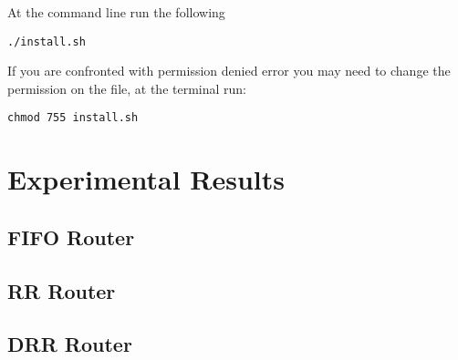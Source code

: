 \documentclass[11pt]{article}
\begin{document}
At the command line run the following

\begin{lstlisting}
./install.sh
\end{lstlisting}

If you are confronted with permission denied error you may need to change the permission on the file, at the terminal run:

\begin{lstlisting}
chmod 755 install.sh
\end{lstlisting}


\section{Experimental Results}

\subsection{FIFO Router}

\subsection{RR Router}

\subsection{DRR Router}
\end{document}
